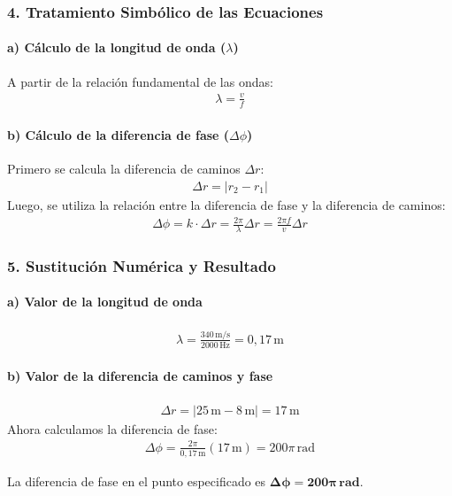 \subsubsection*{4. Tratamiento Simbólico de las Ecuaciones}
\paragraph{a) Cálculo de la longitud de onda ($\lambda$)}
A partir de la relación fundamental de las ondas:
\begin{gather}
    \lambda = \frac{v}{f}
\end{gather}
\paragraph{b) Cálculo de la diferencia de fase ($\Delta\phi$)}
Primero se calcula la diferencia de caminos $\Delta r$:
\begin{gather}
    \Delta r = |r_2 - r_1|
\end{gather}
Luego, se utiliza la relación entre la diferencia de fase y la diferencia de caminos:
\begin{gather}
    \Delta\phi = k \cdot \Delta r = \frac{2\pi}{\lambda} \Delta r = \frac{2\pi f}{v} \Delta r
\end{gather}

\subsubsection*{5. Sustitución Numérica y Resultado}
\paragraph{a) Valor de la longitud de onda}
\begin{gather}
    \lambda = \frac{340 \, \text{m/s}}{2000 \, \text{Hz}} = 0,17 \, \text{m}
\end{gather}
\paragraph{b) Valor de la diferencia de caminos y fase}
\begin{gather}
    \Delta r = |25 \, \text{m} - 8 \, \text{m}| = 17 \, \text{m}
\end{gather}
Ahora calculamos la diferencia de fase:
\begin{gather}
    \Delta\phi = \frac{2\pi}{0,17 \, \text{m}} (17 \, \text{m}) = 200\pi \, \text{rad}
\end{gather}
\begin{cajaresultado}
    La diferencia de fase en el punto especificado es $\boldsymbol{\Delta\phi = 200\pi \, \textbf{rad}}$.
\end{cajaresultado}

